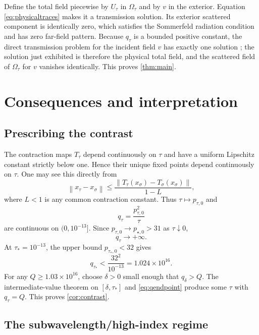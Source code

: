 \documentclass[11pt]{amsart}
\newcommand{\norm}[1]{\left\lVert #1\right\rVert}
\begin{document}
Define the total field piecewise by $U_\tau$ in $\Omega_\tau$ and by $v$ in
the exterior.  Equation \eqref{eq:physicaltraces} makes it a transmission
solution.  Its exterior scattered component is identically zero, which
satisfies the Sommerfeld radiation condition and has zero far-field pattern.
Because $q_\tau$ is a bounded positive constant, the direct transmission
problem for the incident field $v$ has exactly one solution
\cite[Chapter~8]{ColtonKress2019}; the solution just exhibited is therefore
the physical total field, and the scattered field of $\Omega_\tau$ for $v$
vanishes identically.  This proves \cref{thm:main}.

\section{Consequences and interpretation}\label{sec:consequences}

\subsection{Prescribing the contrast}

The contraction maps $T_\tau$ depend continuously on $\tau$ and have a
uniform Lipschitz constant strictly below one.  Hence their unique fixed
points depend continuously on $\tau$.  One may see this directly from
\begin{equation}\label{eq:stability}
  \norm{x_\tau-x_\sigma}
  \le
  \frac{\norm{T_\tau(x_\sigma)-T_\sigma(x_\sigma)}}{1-L},
\end{equation}
where $L<1$ is any common contraction constant.  Thus
$\tau\mapsto p_{\tau,0}$ and
\[
  q_\tau=\frac{p_{\tau,0}^2}{\tau}
\]
are continuous on $(0,10^{-13}]$.  Since
$p_{\tau,0}\to p_{\star,0}>31$ as $\tau\downarrow0$,
\begin{equation}\label{eq:qinfty}
  q_\tau\longrightarrow+\infty.
\end{equation}
At $\tau_*=10^{-13}$, the upper bound $p_{\tau_*,0}<32$ gives
\begin{equation}\label{eq:qendpoint}
  q_{\tau_*}
  <\frac{32^2}{10^{-13}}
  =1.024\times10^{16}.
\end{equation}
For any $Q\ge1.03\times10^{16}$, choose $\delta>0$ small enough that
$q_\delta>Q$.  The intermediate-value theorem on
$[\delta,\tau_*]$ and \eqref{eq:qendpoint} produce some $\tau$ with
$q_\tau=Q$.  This proves \cref{cor:contrast}.

\subsection{The subwavelength/high-index regime}
\end{document}
